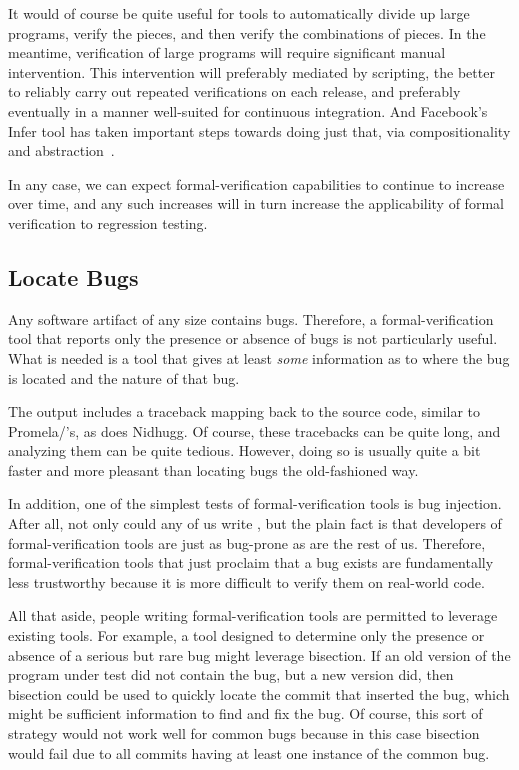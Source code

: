 It would of course be quite useful for tools to automatically divide
up large programs, verify the pieces, and then verify the combinations
of pieces.
In the meantime, verification of large programs will require significant
manual intervention.
This intervention will preferably mediated by scripting, the better to
reliably carry out repeated verifications on each release, and
preferably eventually in a manner well-suited for continuous integration.
And Facebook's Infer tool has taken important steps towards doing just
that, via compositionality and
abstraction~\cite{SamBlackshear2018RacerD,DinoDistefano2019FBstaticAnalysis}.

In any case, we can expect formal-verification capabilities to continue
to increase over time, and any such increases will in turn increase
the applicability of formal verification to regression testing.

\subsection{Locate Bugs}
\label{sec:future:Locate Bugs}

Any software artifact of any size contains bugs.
Therefore, a formal-verification tool that reports only the
presence or absence of bugs is not particularly useful.
What is needed is a tool that gives at least \emph{some} information
as to where the bug is located and the nature of that bug.

The  output includes a traceback mapping back to the source
code, similar to Promela/'s, as does Nidhugg.
Of course, these tracebacks can be quite long, and analyzing them
can be quite tedious.
However, doing so is usually quite a bit faster
and more pleasant than locating bugs the old-fashioned way.

In addition, one of the simplest tests of formal-verification tools is
bug injection.
After all, not only could any of us write
, but the plain fact is that
developers of formal-verification tools are just as bug-prone as
are the rest of us.
Therefore, formal-verification tools that just proclaim that a
bug exists are fundamentally less trustworthy because it is
more difficult to verify them on real-world code.

All that aside, people writing formal-verification tools are
permitted to leverage existing tools.
For example, a tool designed to determine only the presence
or absence of a serious but rare bug might leverage bisection.
If an old version of the program under test did not contain the bug,
but a new version did, then bisection could be used to quickly
locate the commit that inserted the bug, which might be
sufficient information to find and fix the bug.
Of course, this sort of strategy would not work well for common
bugs because in this case bisection would fail due to all commits
having at least one instance of the common bug.

